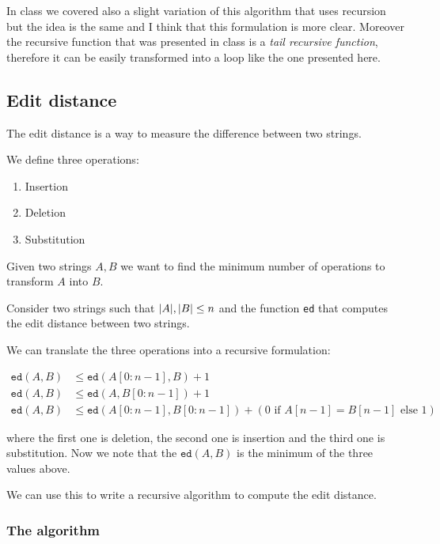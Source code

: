 \documentclass[12pt]{extarticle}
\begin{document}

\begin{remark}
    In class we covered also a slight variation of this algorithm that uses recursion but the idea is the same and I think that this formulation is more clear.
    Moreover the recursive function that was presented in class is a \emph{tail recursive function}, therefore it can be easily transformed into a loop like the one presented here.
\end{remark}

\subsection{Edit distance}

The edit distance is a way to measure the difference between two strings.

We define three operations:
\begin{enumerate}
    \item Insertion
    \item Deletion
    \item Substitution
\end{enumerate}

Given two strings $A, B$ we want to find the minimum number of operations to transform $A$ into $B$.

Consider two strings such that $\abs{A}, \abs{B} \leq n$ and the function \texttt{ed} that computes the edit distance between two strings.

We can translate the three operations into a recursive formulation:

\begin{align}
    \texttt{ed}(A, B) & \leq \texttt{ed}(A[0:n-1], B) + 1                                                      \\
    \texttt{ed}(A, B) & \leq \texttt{ed}(A, B[0:n-1]) + 1                                                      \\
    \texttt{ed}(A, B) & \leq \texttt{ed}(A[0:n-1], B[0:n-1]) + (0 \text{ if } A[n-1] = B[n-1] \text{ else } 1)
\end{align}

where the first one is deletion, the second one is insertion and the third one is substitution.
Now we note that the $\texttt{ed}(A, B)$ is the minimum of the three values above.

We can use this to write a recursive algorithm to compute the edit distance.

\subsubsection{The algorithm}
\end{document}

